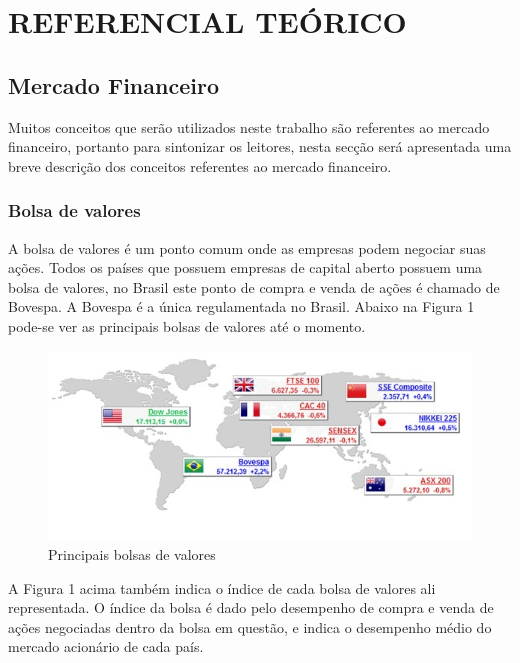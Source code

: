 \chapter{REFERENCIAL TEÓRICO }

\section{Mercado Financeiro}
Muitos conceitos que serão utilizados neste trabalho são referentes ao mercado financeiro, portanto para sintonizar os leitores, nesta secção será apresentada uma breve descrição dos conceitos referentes ao mercado financeiro.

\subsection{Bolsa de valores}
A bolsa de valores é um ponto comum onde as empresas podem negociar suas ações. Todos os países que possuem empresas de capital aberto possuem uma bolsa de valores, no Brasil este ponto de compra e venda de ações é chamado de Bovespa. A Bovespa é a única regulamentada no Brasil\cite{EQUIPETORORADAR}. Abaixo na Figura 1 pode-se ver as principais bolsas de valores até o momento.

 \begin{figure}[htb]
 \centering
 	\caption{Principais bolsas de valores}
 	\label{fig:principais-bolsas}
 	\includegraphics[scale=0.8]{figuras/principais-bolsas.jpg}
 \end{figure}
 
 A Figura 1 acima também indica o índice de cada bolsa de valores ali representada. O índice da bolsa é dado pelo desempenho de compra e venda de ações negociadas dentro da bolsa em questão, e indica o desempenho médio do mercado acionário de cada país\cite{IBOVESPA}.

